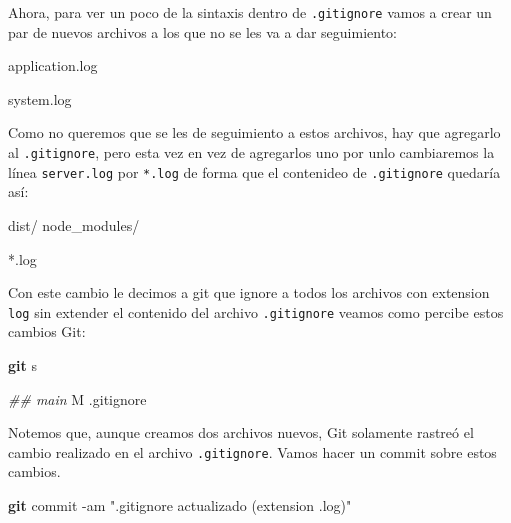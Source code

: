 \documentclass[
]{book}
\newenvironment{Shaded}{\begin{snugshade}}{\end{snugshade}}
\newcommand{\AttributeTok}[1]{\textcolor[rgb]{0.13,0.29,0.53}{#1}}
\newcommand{\CommentTok}[1]{\textcolor[rgb]{0.56,0.35,0.01}{\textit{#1}}}
\newcommand{\ExtensionTok}[1]{#1}
\newcommand{\FunctionTok}[1]{\textcolor[rgb]{0.13,0.29,0.53}{\textbf{#1}}}
\newcommand{\NormalTok}[1]{#1}
\newcommand{\StringTok}[1]{\textcolor[rgb]{0.31,0.60,0.02}{#1}}
\begin{document}
Ahora, para ver un poco de la sintaxis dentro de \texttt{.gitignore} vamos a crear un par de nuevos archivos a los que no se les va a dar seguimiento:

\begin{Shaded}
\begin{Highlighting}[]
\ExtensionTok{application.log}
\end{Highlighting}
\end{Shaded}

\begin{Shaded}
\begin{Highlighting}[]
\ExtensionTok{system.log}
\end{Highlighting}
\end{Shaded}

Como no queremos que se les de seguimiento a estos archivos, hay que agregarlo al \texttt{.gitignore}, pero esta vez en vez de agregarlos uno por unlo cambiaremos la línea \texttt{server.log} por \texttt{*.log} de forma que el contenideo de \texttt{.gitignore} quedaría así:

\begin{Shaded}
\begin{Highlighting}[]
\ExtensionTok{dist/}
\ExtensionTok{node\_modules/}

\ExtensionTok{*.log}
\end{Highlighting}
\end{Shaded}

Con este cambio le decimos a git que ignore a todos los archivos con extension \texttt{log} sin extender el contenido del archivo \texttt{.gitignore} veamos como percibe estos cambios Git:

\begin{Shaded}
\begin{Highlighting}[]
\FunctionTok{git}\NormalTok{ s}
\end{Highlighting}
\end{Shaded}

\begin{Shaded}
\begin{Highlighting}[]
\CommentTok{\#\# main}
 \ExtensionTok{M}\NormalTok{ .gitignore}
\end{Highlighting}
\end{Shaded}

Notemos que, aunque creamos dos archivos nuevos, Git solamente rastreó el cambio realizado en el archivo \texttt{.gitignore}. Vamos hacer un commit sobre estos cambios.

\begin{Shaded}
\begin{Highlighting}[]
\FunctionTok{git}\NormalTok{ commit }\AttributeTok{{-}am} \StringTok{".gitignore actualizado (extension .log)"}
\end{Highlighting}
\end{Shaded}
\end{document}
